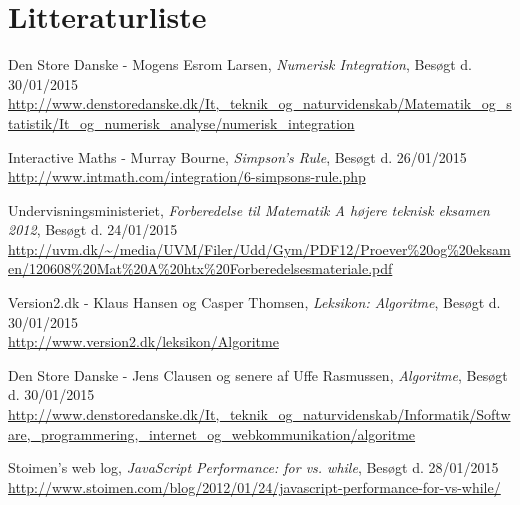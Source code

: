 \documentclass[12pt]{article}
\numberwithin{equation}{section}
\begin{document}
\clearpage
\section{Litteraturliste}
\begin{thebibliography}{9}
	Den Store Danske - Mogens Esrom Larsen,
	\emph{Numerisk Integration},
	Besøgt d. 30/01/2015\\
	\url{http://www.denstoredanske.dk/It,_teknik_og_naturvidenskab/Matematik_og_statistik/It_og_numerisk_analyse/numerisk_integration}
	

	Interactive Maths - Murray Bourne,
	\emph{Simpson's Rule},
	Besøgt d. 26/01/2015\\
	\url{http://www.intmath.com/integration/6-simpsons-rule.php}
	
	Undervisningsministeriet,
	\emph{Forberedelse til Matematik A højere teknisk eksamen 2012},
	Besøgt d. 24/01/2015\\
	\url{http://uvm.dk/~/media/UVM/Filer/Udd/Gym/PDF12/Proever\%20og\%20eksamen/120608\%20Mat\%20A\%20htx\%20Forberedelsesmateriale.pdf}
	
	Version2.dk - Klaus Hansen og Casper Thomsen,
	\emph{Leksikon: Algoritme},
	Besøgt d. 30/01/2015\\
	\url{http://www.version2.dk/leksikon/Algoritme}
	
	Den Store Danske - Jens Clausen og senere af Uffe Rasmussen,
	\emph{Algoritme},
	Besøgt d. 30/01/2015\\
	\url{http://www.denstoredanske.dk/It,_teknik_og_naturvidenskab/Informatik/Software,_programmering,_internet_og_webkommunikation/algoritme}

	Stoimen's web log,
	\emph{JavaScript Performance: for vs. while},
	Besøgt d. 28/01/2015\\
	\url{http://www.stoimen.com/blog/2012/01/24/javascript-performance-for-vs-while/}
\end{thebibliography}
\end{document}
